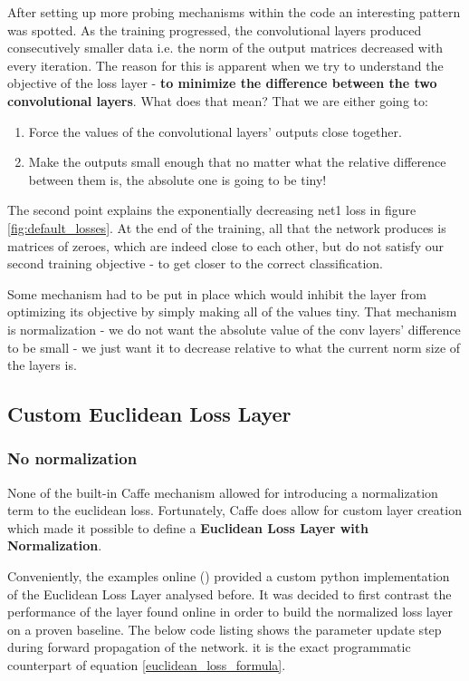 \documentclass[a4paper, 12pt]{article}
\numberwithin{equation}{section}
\begin{document}
	After setting up more probing mechanisms within the code an interesting pattern was spotted. As the training progressed, the convolutional layers produced consecutively smaller data i.e. the norm of the output matrices decreased with every iteration. The reason for this is apparent when we try to understand the objective of the loss layer - \textbf{to minimize the difference between the two convolutional layers}. What does that mean? That we are either going to:
	\begin{enumerate}
		\item Force the values of the convolutional layers' outputs close together.
		\item Make the outputs small enough that no matter what the relative difference between them is, the absolute one is going to be tiny!
	\end{enumerate} 
	
	The second point explains the exponentially decreasing net1 loss in figure \ref{fig:default_losses}. At the end of the training, all that the network produces is matrices of zeroes, which are indeed close to each other, but do not satisfy our second training objective - to get closer to the correct classification.
	
	Some mechanism had to be put in place which would inhibit the layer from optimizing its objective by simply making all of the values tiny. That mechanism is normalization - we do not want the absolute value of the conv layers' difference to be small - we just want it to decrease relative to what the current norm size of the layers is.
	
	\subsection{Custom Euclidean Loss Layer}
	
	\subsubsection{No normalization}
	
	None of the built-in Caffe mechanism allowed for introducing a normalization term to the euclidean loss. Fortunately, Caffe does allow for custom layer creation which made it possible to define a \textbf{Euclidean Loss Layer with Normalization}.
	
	Conveniently, the examples online (\cite{caffe2016loss}) provided a custom python implementation of the Euclidean Loss Layer analysed before. It was decided to first contrast the performance of the layer found online in order to build the normalized loss layer on a proven baseline. The below code listing shows the parameter update step during forward propagation of the network. it is the exact programmatic counterpart of equation \ref{euclidean_loss_formula}.\\
	
\end{document}
